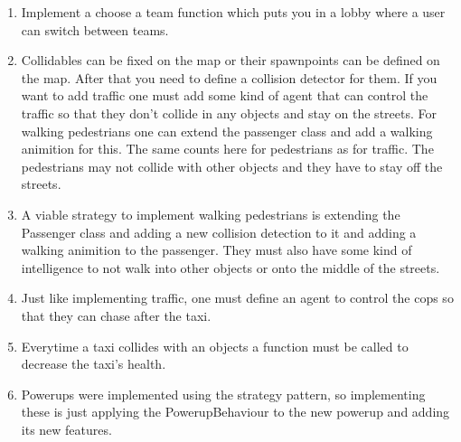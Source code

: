 \begin{enumerate}	
\item Implement a choose a team function which puts you in a lobby where a user can switch between teams.
\item Collidables can be fixed on the map or their spawnpoints can be defined on the map. After that you need to define a collision detector for them. If you want to add traffic one must add some kind of agent that can control the traffic so that they don't collide in any objects and stay on the streets. For walking pedestrians one can extend the passenger class and add a walking animition for this. The same counts here for pedestrians as for traffic. The pedestrians may not collide with other objects and they have to stay off the streets.
\item A viable strategy to implement walking pedestrians is extending the Passenger class and adding a new collision detection to it and adding a walking animition to the passenger. They must also have some kind of intelligence to not walk into other objects or onto the middle of the streets.
\item Just like implementing traffic, one must define an agent to control the cops so that they can chase after the taxi.
\item Everytime a taxi collides with an objects a function must be called to decrease the taxi's health.
\item Powerups were implemented using the strategy pattern, so implementing these is just applying the PowerupBehaviour to the new powerup and adding its new features.
\end{enumerate}



